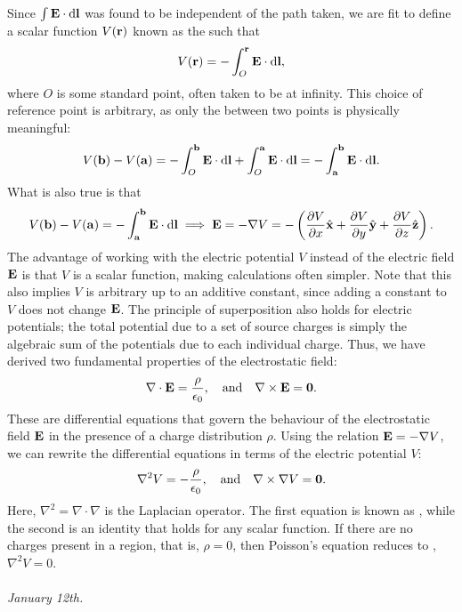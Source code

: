 Since $\int \mathbf{E} \cdot \mathrm{d}\mathbf{l}$ was found to be independent of the path taken, we are fit to define a scalar function $V(\mathbf{r})$ known as the  such that
\begin{align}
    V(\mathbf{r}) = - \int_{O}^{\mathbf{r}} \mathbf{E} \cdot \mathrm{d}\mathbf{l},
\end{align}
where $O$ is some standard point, often taken to be at infinity. This choice of reference point is arbitrary, as only the  between two points is physically meaningful:
\begin{align}
    V(\mathbf{b}) - V(\mathbf{a}) = - \int_{O}^{\mathbf{b}} \mathbf{E} \cdot \mathrm{d}\mathbf{l} + \int_{O}^{\mathbf{a}} \mathbf{E} \cdot \mathrm{d}\mathbf{l} = - \int_{\mathbf{a}}^{\mathbf{b}} \mathbf{E} \cdot \mathrm{d}\mathbf{l}.
\end{align}
What is also true is that
\begin{align}
    V(\mathbf{b}) - V(\mathbf{a}) = - \int_{\mathbf{a}}^{\mathbf{b}} \mathbf{E} \cdot \mathrm{d}\mathbf{l} \implies \mathbf{E} = - \nabla V = - \left( \frac{\partial V}{\partial x} \hat{\mathbf{x}} + \frac{\partial V}{\partial y} \hat{\mathbf{y}} + \frac{\partial V}{\partial z} \hat{\mathbf{z}} \right).
\end{align}
The advantage of working with the electric potential $V$ instead of the electric field $\mathbf{E}$ is that $V$ is a scalar function, making calculations often simpler. Note that this also implies $V$ is arbitrary up to an additive constant, since adding a constant to $V$ does not change $\mathbf{E}$. The principle of superposition also holds for electric potentials; the total potential due to a set of source charges is simply the algebraic sum of the potentials due to each individual charge. Thus, we have derived two fundamental properties of the electrostatic field:
\begin{align}
    \nabla \cdot \mathbf{E} = \frac{\rho}{\epsilon_{0}}, \quad \text{and} \quad \nabla \times \mathbf{E} = \mathbf{0}.
\end{align}
These are differential equations that govern the behaviour of the electrostatic field $\mathbf{E}$ in the presence of a charge distribution $\rho$. Using the relation $\mathbf{E} = - \nabla V$, we can rewrite the differential equations in terms of the electric potential $V$:
\begin{align}
    \nabla^{2} V = - \frac{\rho}{\epsilon_{0}}, \quad \text{and} \quad \nabla \times \nabla V = \mathbf{0}.
\end{align}
Here, $\nabla^{2} = \nabla \cdot \nabla$ is the Laplacian operator. The first equation is known as , while the second is an identity that holds for any scalar function. If there are no charges present in a region, that is, $\rho = 0$, then Poisson's equation reduces to , $\nabla^{2} V = 0$.
\\ \\
\textit{January 12th.}

